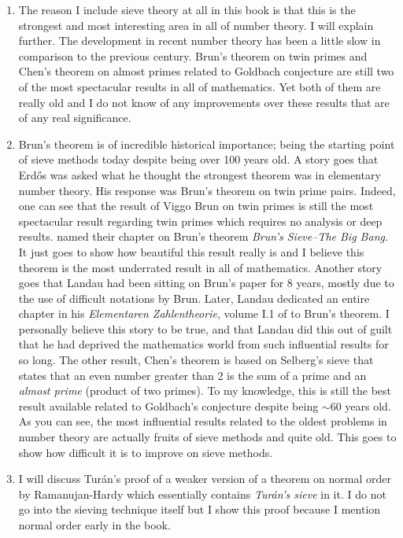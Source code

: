 \documentclass[12pt, leqno]{book}
\theoremstyle{definition}
\begin{document}
\begin{enumerate}
			\item The reason I include sieve theory at all in this book is that this is the strongest and most interesting area in all of number theory. I will explain further. The development in recent number theory has been a little slow in comparison to the previous century. Brun's theorem on twin primes and Chen's theorem on almost primes related to Goldbach conjecture are still two of the most spectacular results in all of mathematics. Yet both of them are really old and I do not know of any improvements over these results that are of any real significance. \item Brun's theorem is of incredible historical importance; being the starting point of sieve methods today despite being over 100 years old. A story goes that Erd\H{o}s was asked what he thought the strongest theorem was in elementary number theory. His response was Brun's theorem on twin prime pairs. Indeed, one can see that the result of Viggo Brun on twin primes is still the most spectacular result regarding twin primes which requires no analysis or deep results. \textcite[Chapter VI]{friedlander_iwaniec_2010} named their chapter on Brun's theorem \textit{Brun’s Sieve--The Big Bang}. It just goes to show how beautiful this result really is and I believe this theorem is the most underrated result in all of mathematics. Another story goes that Landau had been sitting on Brun's paper for 8 years, mostly due to the use of difficult notations by Brun. Later, Landau dedicated an entire chapter in his \textit{Elementaren Zahlentheorie}, volume I.1 of \textcite{landau_1927} to Brun's theorem. I personally believe this story to be true, and that Landau did this out of guilt that he had deprived the mathematics world from such influential results for so long. The other result, Chen's theorem is based on Selberg's sieve that states that an even number greater than 2 is the sum of a prime and an \textit{almost prime} (product of two primes). To my knowledge, this is still the best result available related to Goldbach's conjecture despite being $\sim$60 years old. As you can see, the most influential results related to the oldest problems in number theory are actually fruits of sieve methods and quite old. This goes to show how difficult it is to improve on sieve methods.
			\item I will discuss Tur\'{a}n's proof of a weaker version of a theorem on normal order by Ramanujan-Hardy which essentially contains \textit{Tur\'{a}n's sieve} in it. I do not go into the sieving technique itself but I show this proof because I mention normal order early in the book.

\end{enumerate}
\end{document}
